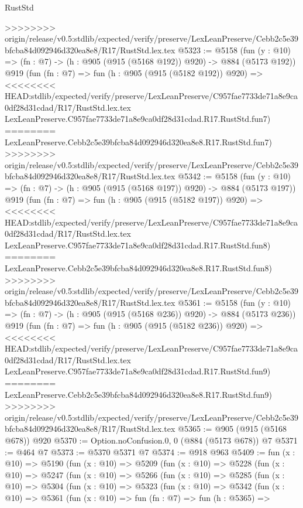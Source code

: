 \begin{lexlean}{RustStd}
\begin{coremodule}
{\begin{coremodule}
{{{{{{{{{{{{{{>>>>>>>> origin/release/v0.5:stdlib/expected/verify/preserve/LexLeanPreserve/Cebb2c5e39bfcba84d092946d320ea8e8/R17/RustStd.lex.tex
@5323 := @5158
    (fun (y : @10) => (fn : @7) -> (h : @905 (@915 (@5168 @192)) @920) -> @884 (@5173 @192))
    @919
    (fun (fn : @7) =>
    fun (h : @905 (@915 (@5182 @192)) @920) =>
<<<<<<<< HEAD:stdlib/expected/verify/preserve/LexLeanPreserve/C957fae7733de71a8e9ca0df28d31cdad/R17/RustStd.lex.tex
    LexLeanPreserve.C957fae7733de71a8e9ca0df28d31cdad.R17.RustStd.fun7)
========
    LexLeanPreserve.Cebb2c5e39bfcba84d092946d320ea8e8.R17.RustStd.fun7)
>>>>>>>> origin/release/v0.5:stdlib/expected/verify/preserve/LexLeanPreserve/Cebb2c5e39bfcba84d092946d320ea8e8/R17/RustStd.lex.tex
@5342 := @5158
    (fun (y : @10) => (fn : @7) -> (h : @905 (@915 (@5168 @197)) @920) -> @884 (@5173 @197))
    @919
    (fun (fn : @7) =>
    fun (h : @905 (@915 (@5182 @197)) @920) =>
<<<<<<<< HEAD:stdlib/expected/verify/preserve/LexLeanPreserve/C957fae7733de71a8e9ca0df28d31cdad/R17/RustStd.lex.tex
    LexLeanPreserve.C957fae7733de71a8e9ca0df28d31cdad.R17.RustStd.fun8)
========
    LexLeanPreserve.Cebb2c5e39bfcba84d092946d320ea8e8.R17.RustStd.fun8)
>>>>>>>> origin/release/v0.5:stdlib/expected/verify/preserve/LexLeanPreserve/Cebb2c5e39bfcba84d092946d320ea8e8/R17/RustStd.lex.tex
@5361 := @5158
    (fun (y : @10) => (fn : @7) -> (h : @905 (@915 (@5168 @236)) @920) -> @884 (@5173 @236))
    @919
    (fun (fn : @7) =>
    fun (h : @905 (@915 (@5182 @236)) @920) =>
<<<<<<<< HEAD:stdlib/expected/verify/preserve/LexLeanPreserve/C957fae7733de71a8e9ca0df28d31cdad/R17/RustStd.lex.tex
    LexLeanPreserve.C957fae7733de71a8e9ca0df28d31cdad.R17.RustStd.fun9)
========
    LexLeanPreserve.Cebb2c5e39bfcba84d092946d320ea8e8.R17.RustStd.fun9)
>>>>>>>> origin/release/v0.5:stdlib/expected/verify/preserve/LexLeanPreserve/Cebb2c5e39bfcba84d092946d320ea8e8/R17/RustStd.lex.tex
@5365 := @905 (@915 (@5168 @678)) @920
@5370 := Option.noConfusion.{0, 0} (@884 (@5173 @678)) @7
@5371 := @464 @7
@5373 := @5370 @5371 @7
@5374 := @918 @963
@5409 := fun (x : @10) =>
  @5190
    (fun (x : @10) =>
    @5209
      (fun (x : @10) =>
      @5228
        (fun (x : @10) =>
        @5247
          (fun (x : @10) =>
          @5266
            (fun (x : @10) =>
            @5285
              (fun (x : @10) =>
              @5304
                (fun (x : @10) =>
                @5323
                  (fun (x : @10) =>
                  @5342
                    (fun (x : @10) =>
                    @5361
                      (fun (x : @10) =>
                      fun (fn : @7) =>
                      fun (h : @5365) =>
}}}}}}}}}}}}}}
\end{coremodule}}
\end{coremodule}
\end{lexlean}
